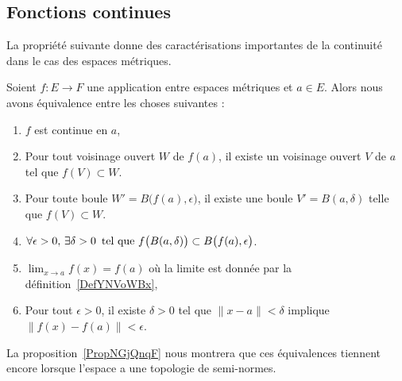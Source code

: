 \subsection{Fonctions continues}
La propriété suivante donne des caractérisations importantes de la continuité dans le cas des espaces métriques.
\begin{proposition} \label{PropQZRNpMn}
    Soient \( f\colon E\to F\) une application entre espaces métriques et \( a\in E\). Alors nous avons équivalence entre les choses suivantes :
    \begin{enumerate}
        \item\label{ItemCBUoRWJi}
            \( f\) est continue en \( a\),
        \item\label{ItemCBUoRWJii}
            Pour tout voisinage ouvert \( W\) de \( f(a)\), il existe un voisinage ouvert \( V\) de \( a\) tel que \( f(V)\subset W\).
        \item\label{ItemCBUoRWJiii}
            Pour toute boule \( W'=B\big( f(a),\epsilon \big)\), il existe une boule \( V'=B(a,\delta)\) telle que \( f(V)\subset W\).
        \item\label{ItemCBUoRWJiv}
            $\forall \epsilon>0,\,\exists \delta>0\,\text{ tel que } f\big( B(a,\delta) \big)\subset B\big( f(a),\epsilon \big)$.
        \item\label{ItemYNQpikrii}
            \( \lim_{x\to a}f(x)=f(a)\) où la limite est donnée par la définition~\ref{DefYNVoWBx},
        \item\label{ItemYNQpikriii}
            Pour tout \( \epsilon>0\), il existe \( \delta>0\) tel que \( \| x-a \|<\delta\) implique \( \| f(x)-f(a) \|<\epsilon\).
    \end{enumerate}
\end{proposition}
La proposition~\ref{PropNGjQnqF} nous montrera que ces équivalences tiennent encore lorsque l'espace a une topologie de semi-normes.

